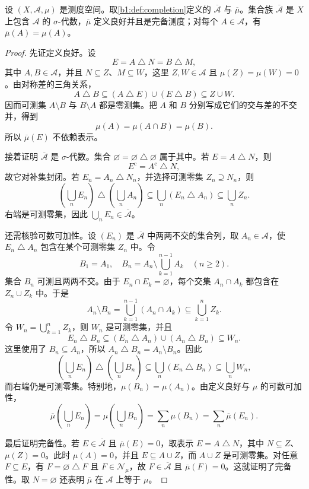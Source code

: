 \begin{theorem}
\label{b1:thm:completion-measure}
设 \((X,\mathcal A,\mu)\) 是测度空间。取\cref{b1:def:completion}定义的 \(\overline{\mathcal A}\) 与 \(\overline\mu\)。集合族 \(\overline{\mathcal A}\) 是 \(X\) 上包含 \(\mathcal A\) 的 \(\sigma\)-代数，\(\overline\mu\) 定义良好并且是完备测度；对每个 \(A\in\mathcal A\)，有 \(\overline\mu(A)=\mu(A)\)。
\end{theorem}
\begin{proof}
先证定义良好。设
\[
E=A\mathbin{\triangle}N=B\mathbin{\triangle}M,
\]
其中 \(A,B\in\mathcal A\)，并且 \(N\subseteq Z\)、\(M\subseteq W\)，这里 \(Z,W\in\mathcal A\) 且 \(\mu(Z)=\mu(W)=0\)。由对称差的三角关系，
\[
A\mathbin{\triangle}B
\subseteq (A\mathbin{\triangle}E)\cup(E\mathbin{\triangle}B)
\subseteq Z\cup W.
\]
因而可测集 \(A\setminus B\) 与 \(B\setminus A\) 都是零测集。把 \(A\) 和 \(B\) 分别写成它们的交与差的不交并，得到
\[
\mu(A)=\mu(A\cap B)=\mu(B).
\]
所以 \(\overline\mu(E)\) 不依赖表示。

接着证明 \(\overline{\mathcal A}\) 是 \(\sigma\)-代数。集合 \(\varnothing=\varnothing\mathbin{\triangle}\varnothing\) 属于其中。若 \(E=A\mathbin{\triangle}N\)，则
\[
E^{\mathrm c}=A^{\mathrm c}\mathbin{\triangle}N,
\]
故它对补集封闭。若 \(E_n=A_n\mathbin{\triangle}N_n\)，并选择可测零集 \(Z_n\supseteq N_n\)，则
\[
\left(\bigcup_nE_n\right)\mathbin{\triangle}
\left(\bigcup_nA_n\right)
\subseteq\bigcup_n(E_n\mathbin{\triangle}A_n)
\subseteq\bigcup_nZ_n.
\]
右端是可测零集，因此 \(\bigcup_nE_n\in\overline{\mathcal A}\)。

还需核验可数可加性。设 \((E_n)\) 是 \(\overline{\mathcal A}\) 中两两不交的集合列，取 \(A_n\in\mathcal A\)，使 \(E_n\mathbin{\triangle}A_n\) 包含在某个可测零集 \(Z_n\) 中。令
\[
B_1=A_1,
\quad
B_n=A_n\setminus\bigcup_{k=1}^{n-1}A_k\quad(n\geq2).
\]
集合 \(B_n\) 可测且两两不交。由于 \(E_n\cap E_k=\varnothing\)，每个交集 \(A_n\cap A_k\) 都包含在 \(Z_n\cup Z_k\) 中。于是
\[
A_n\setminus B_n
=\bigcup_{k=1}^{n-1}(A_n\cap A_k)
\subseteq\bigcup_{k=1}^{n}Z_k.
\]
令 \(W_n=\bigcup_{k=1}^{n}Z_k\)，则 \(W_n\) 是可测零集，并且
\[
E_n\mathbin{\triangle}B_n
\subseteq(E_n\mathbin{\triangle}A_n)
\cup(A_n\mathbin{\triangle}B_n)
\subseteq W_n.
\]
这里使用了 \(B_n\subseteq A_n\)，所以
\(
A_n\mathbin{\triangle}B_n=A_n\setminus B_n
\)。因此
\[
\left(\bigcup_nE_n\right)\mathbin{\triangle}
\left(\bigcup_nB_n\right)
\subseteq\bigcup_n(E_n\mathbin{\triangle}B_n)
\subseteq\bigcup_nW_n,
\]
而右端仍是可测零集。特别地，\(\mu(B_n)=\mu(A_n)\)。由定义良好与 \(\mu\) 的可数可加性，
\[
\overline\mu\left(\bigcup_nE_n\right)
=\mu\left(\bigcup_nB_n\right)
=\sum_n\mu(B_n)
=\sum_n\overline\mu(E_n).
\]

最后证明完备性。若 \(E\in\overline{\mathcal A}\) 且 \(\overline\mu(E)=0\)，取表示 \(E=A\mathbin{\triangle}N\)，其中 \(N\subseteq Z\)、\(\mu(Z)=0\)。此时 \(\mu(A)=0\)，并且 \(E\subseteq A\cup Z\)，而 \(A\cup Z\) 是可测零集。对任意 \(F\subseteq E\)，有 \(F=\varnothing\mathbin{\triangle}F\) 且 \(F\in\mathcal N_\mu\)，故 \(F\in\overline{\mathcal A}\) 且 \(\overline\mu(F)=0\)。这就证明了完备性。取 \(N=\varnothing\) 还表明 \(\overline\mu\) 在 \(\mathcal A\) 上等于 \(\mu\)。
\end{proof}

